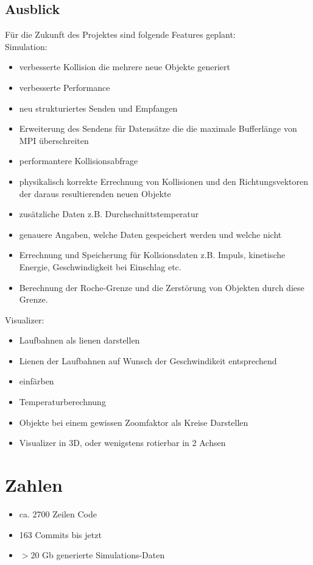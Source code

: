 \subsection{Ausblick}
Für die Zukunft des Projektes sind folgende Features geplant:
\\
Simulation:
\begin{itemize}
    \item verbesserte Kollision die mehrere neue Objekte generiert
    \item verbesserte Performance
    \item neu strukturiertes Senden und Empfangen
    \item Erweiterung des Sendens für Datensätze die die maximale Bufferlänge von MPI überschreiten
    \item performantere Kollisionsabfrage
    \item physikalisch korrekte Errechnung von Kollisionen und den Richtungsvektoren der daraus resultierenden neuen Objekte
    \item zusätzliche Daten z.B. Durchschnittstemperatur
    \item genauere Angaben, welche Daten gespeichert werden und welche nicht
    \item Errechnung und Speicherung für Kollsionsdaten z.B. Impuls, kinetische Energie, Geschwindigkeit bei Einschlag etc.
    \item Berechnung der Roche-Grenze und die Zerstörung von Objekten durch diese Grenze.
\end{itemize}
Visualizer:
\begin{itemize}
    \item Laufbahnen als lienen darstellen
    \item Lienen der Laufbahnen auf Wunsch der Geschwindikeit entsprechend
    \item einfärben
    \item Temperaturberechnung
    \item Objekte bei einem gewissen Zoomfaktor als Kreise Darstellen
    \item Visualizer in 3D, oder wenigstens rotierbar in 2 Achsen
\end{itemize}

\section{Zahlen}
\begin{itemize}
    \item ca. 2700 Zeilen Code
    \item 163 Commits bis jetzt
    \item $>$20 Gb generierte Simulations-Daten
\end{itemize}

